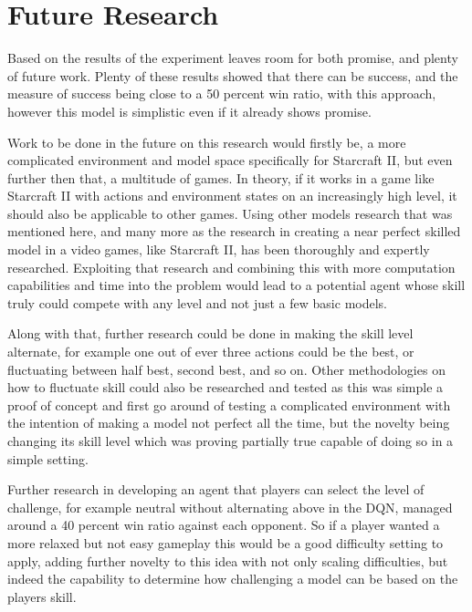 \section{Future Research}
\label{sec:future}


Based on the results of the experiment leaves room for both promise, and plenty of future work. Plenty of these results showed that there can be success, and the measure of success being close to a 50 percent win ratio, with this approach, however this model
is simplistic even if it already shows promise.

Work to be done in the future on this research would firstly be, a more complicated environment and model space specifically for Starcraft II, but even further then that, a multitude of games. In theory, if it works in a game like Starcraft II with actions and 
environment states on an increasingly high level, it should also be applicable to other games. Using other models research that was mentioned here\cite{starcraft_unplugged}\cite{liu2021mAS}\cite{liu2021mASreport}\cite{vinyals2017starcraft}, and many more as the 
research in creating a near perfect skilled model in a video games, like Starcraft II, has been thoroughly and expertly researched. Exploiting that research and combining this with more computation capabilities and time into the problem would lead to a potential
agent whose skill truly could compete with any level and not just a few basic models. 

Along with that, further research could be done in making the skill level alternate, for example one out of ever three actions could be the best, or fluctuating between half best, second best, and so on. Other methodologies on how to fluctuate skill could also 
be researched and tested  as this was simple a proof of concept and first go around of testing a complicated environment with the intention of making a model not perfect all the time, but the novelty being changing its skill level which was proving partially true
capable of doing so in a simple setting. 

Further research in developing an agent that players can select the level of challenge, for example neutral without alternating above in the DQN, managed around a 40 percent win ratio against each opponent. So if a player wanted a more relaxed but not easy gameplay
this would be a good difficulty setting to apply, adding further novelty to this idea with not only scaling difficulties, but indeed the capability to determine how challenging a model can be based on the players skill. 